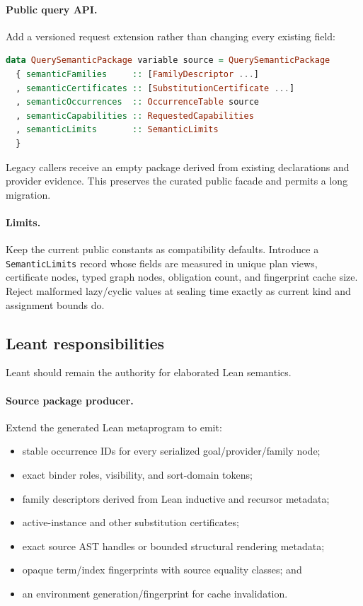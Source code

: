 \documentclass[11pt]{article}
\newcommand{\code}[1]{\texttt{#1}}
\newcommand{\Leant}{\textsf{Leant}}
\begin{document}
\paragraph{Public query API.}

Add a versioned request extension rather than changing every existing field:

\begin{lstlisting}[language=Haskell]
data QuerySemanticPackage variable source = QuerySemanticPackage
  { semanticFamilies     :: [FamilyDescriptor ...]
  , semanticCertificates :: [SubstitutionCertificate ...]
  , semanticOccurrences  :: OccurrenceTable source
  , semanticCapabilities :: RequestedCapabilities
  , semanticLimits       :: SemanticLimits
  }
\end{lstlisting}

Legacy callers receive an empty package derived from existing declarations and
provider evidence.  This preserves the curated public facade and permits a
long migration.

\paragraph{Limits.}

Keep the current public constants as compatibility defaults.  Introduce a
\code{SemanticLimits} record whose fields are measured in unique plan views,
certificate nodes, typed graph nodes, obligation count, and fingerprint cache
size.  Reject malformed lazy/cyclic values at sealing time exactly as current
kind and assignment bounds do.

\subsection{Leant responsibilities}

\Leant{} should remain the authority for elaborated Lean semantics.

\paragraph{Source package producer.}

Extend the generated Lean metaprogram to emit:

\begin{itemize}
  \item stable occurrence IDs for every serialized goal/provider/family node;
  \item exact binder roles, visibility, and sort-domain tokens;
  \item family descriptors derived from Lean inductive and recursor metadata;
  \item active-instance and other substitution certificates;
  \item exact source AST handles or bounded structural rendering metadata;
  \item opaque term/index fingerprints with source equality classes; and
  \item an environment generation/fingerprint for cache invalidation.
\end{itemize}
\end{document}
